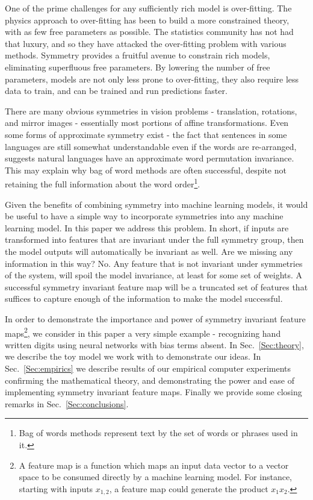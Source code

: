 \documentclass[twocolumn, prl, nofootinbib]{revtex4-1}
\begin{document}

One of the prime challenges for any sufficiently rich model is over-fitting. The physics approach to over-fitting has been to build a more constrained theory, with as few free parameters as possible. The statistics community has not had that luxury, and so they have attacked the over-fitting problem with various methods. Symmetry provides a fruitful avenue to constrain rich models, eliminating superfluous free parameters. By lowering the number of free parameters, models are not only less prone to over-fitting, they also require less data to train, and can be trained and run predictions faster.


There are many obvious symmetries in vision problems - translation, rotations, and mirror images - essentially most portions of affine transformations\cite{gens2014deep, dieleman2016exploiting, cohen2016group, henriques2016warped}. Even some forms of approximate symmetry exist\cite{kiddonsymmetry} - the fact that sentences in some languages are still somewhat understandable even if the words are re-arranged, suggests natural languages have an approximate word permutation invariance. This may explain why bag of word methods are often successful, despite not retaining the full information about the word order\footnote{Bag of words methods represent text by the set of words or phrases used in it.}. 

Given the benefits of combining symmetry into machine learning models, it would be useful to have a simple way to incorporate symmetries into any machine learning model. In this paper we address this problem. In short, if inputs are transformed into features that are invariant under the full symmetry group, then the model outputs will automatically be invariant as well. Are we missing any information in this way? No. Any feature that is not invariant under symmetries of the system, will spoil the model invariance, at least for some set of weights. A successful symmetry invariant feature map will be a truncated set of features that suffices to capture enough of the information to make the model successful.

In order to demonstrate the importance and power of symmetry invariant feature maps\footnote{A feature map is a function which maps an input data vector to a vector space to be consumed directly by a machine learning model. For instance, starting with inputs $x_{1,2}$, a feature map could generate the product $x_1 x_2$.}, we consider in this paper a very simple example - recognizing hand written digits using neural networks with bias terms absent. In Sec.~\ref{Sec:theory}, we describe the toy model we work with to demonstrate our ideas. In Sec.~\ref{Sec:empirics} we describe results of our empirical computer experiments confirming the mathematical theory, and demonstrating the power and ease of implementing symmetry invariant feature maps. Finally we provide some closing remarks in Sec.~\ref{Sec:conclusions}.
\end{document}
